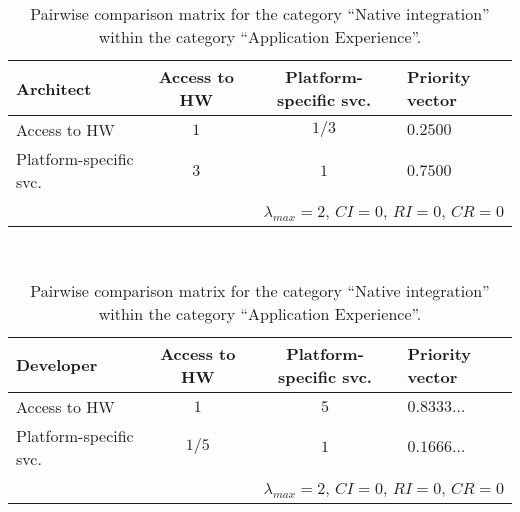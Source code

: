 \begin{table}[h]
    \begin{center}
        \begin{tabular}{lccl}
            \hline
            \textbf{Architect}     & Access to HW & Platform-specific svc. & Priority vector \\
            \hline
            Access to HW           & $1$          & $1/3$                  & $0.2500$        \\
            Platform-specific svc. & $3$          & $1$                    & $0.7500$        \\
            \hline
            \multicolumn{4}{r}{$\lambda_{max} = 2$, $CI = 0$, $RI = 0$, $CR = 0$}            \\
            \hline
        \end{tabular}
        \\\vspace{1em}
        \begin{tabular}{lccl}
            \hline
            \textbf{Developer}     & Access to HW & Platform-specific svc. & Priority vector \\
            \hline
            Access to HW           & $1$          & $5$                    & $0.8333\ldots$  \\
            Platform-specific svc. & $1/5$        & $1$                    & $0.1666\ldots$  \\
            \hline
            \multicolumn{4}{r}{$\lambda_{max} = 2$, $CI = 0$, $RI = 0$, $CR = 0$}            \\
            \hline
        \end{tabular}
        \caption{Pairwise comparison matrix for the category ``Native integration'' within the category ``Application Experience''.}
        \label{tab:ni}
    \end{center}
\end{table}

